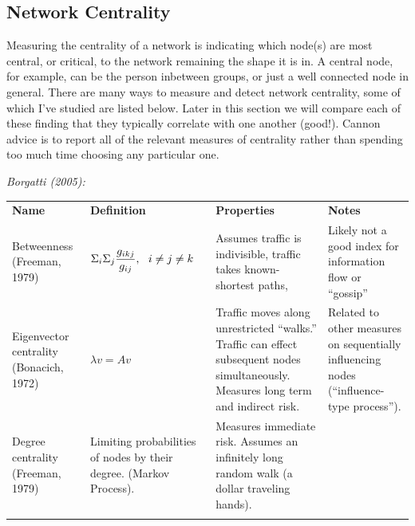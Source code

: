 \documentclass[12pt]{article}\usepackage[]{graphicx}\usepackage[]{color}
\begin{document}
\begin{flushleft}
\subsection{Network Centrality}

Measuring the centrality of a network is indicating which node(s) are most central, or critical, to the network remaining the shape it is in. A central node, for example, can be the person inbetween groups, or just a well connected node in general. There are many ways to measure and detect network centrality, some of which I've studied are listed below. Later in this section we will compare each of these finding that they typically correlate with one another (good!). Cannon advice is to report all of the relevant measures of centrality rather than spending too much time choosing any particular one.

\textit{Borgatti (2005):}
\begin{longtable}{m{2.8cm}  m{4cm} m{5.7cm} m{4.7cm}  }
\hline\noalign{\smallskip}
\textbf{Name} & \textbf{Definition} & \textbf{Properties} & \textbf{Notes} \\
\noalign{\smallskip}\hline\noalign{\smallskip}
Betweenness (Freeman, 1979) & $\mathlarger{ \Sigma_i \Sigma_j \frac{g_{ikj}}{g_{ij}}, ~~ i \neq j \neq k }$ & Assumes traffic is indivisible, traffic takes known-shortest paths,   & Likely not a good index for information flow or ``gossip'' \\
Eigenvector centrality (Bonacich, 1972) & $\lambda v = A v$ & Traffic moves along unrestricted ``walks.'' Traffic can effect subsequent nodes simultaneously. Measures long term and indirect risk.   & Related to other measures on sequentially influencing nodes (``influence-type process'').\\
Degree centrality (Freeman, 1979) & Limiting probabilities of nodes by their degree. (Markov Process).    & Measures immediate risk. Assumes an infinitely long random walk (a dollar traveling hands). \\
\noalign{\smallskip}\hline\noalign{\smallskip}
\end{longtable}



\end{flushleft}
\end{document}
